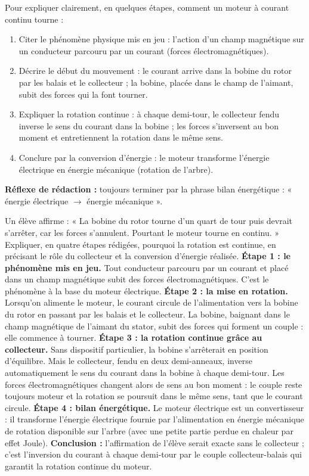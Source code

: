 \documentclass[11pt]{article}
\newcommand{\cle}[1]{{\popxbold\color{popdark}#1}}
\begin{document}
\begin{methode}
Pour expliquer clairement, en quelques étapes, comment un moteur à courant continu tourne :
\begin{enumerate}
\item Citer le \cle{phénomène physique} mis en jeu : l'action d'un champ magnétique sur un conducteur parcouru par un courant (forces électromagnétiques).
\item Décrire le début du mouvement : le courant arrive dans la bobine du rotor par les balais et le collecteur ; la bobine, placée dans le champ de l'aimant, subit des forces qui la font tourner.
\item Expliquer la \cle{rotation continue} : à chaque demi-tour, le collecteur fendu inverse le sens du courant dans la bobine ; les forces s'inversent au bon moment et entretiennent la rotation dans le même sens.
\item Conclure par la \cle{conversion d'énergie} : le moteur transforme l'énergie électrique en énergie mécanique (rotation de l'arbre).
\end{enumerate}
\textbf{Réflexe de rédaction :} toujours terminer par la phrase bilan énergétique : « énergie électrique $\rightarrow$ énergie mécanique ».
\end{methode}

\begin{exoresolu}
Un élève affirme : « La bobine du rotor tourne d'un quart de tour puis devrait s'arrêter, car les forces s'annulent. Pourtant le moteur tourne en continu. » Expliquer, en quatre étapes rédigées, pourquoi la rotation est continue, en précisant le rôle du collecteur et la conversion d'énergie réalisée.
\tcblower
\textbf{Étape 1 : le phénomène mis en jeu.} Tout conducteur parcouru par un courant et placé dans un champ magnétique subit des \cle{forces électromagnétiques}. C'est le phénomène à la base du moteur électrique.
\textbf{Étape 2 : la mise en rotation.} Lorsqu'on alimente le moteur, le courant circule de l'alimentation vers la bobine du rotor en passant par les balais et le collecteur. La bobine, baignant dans le champ magnétique de l'aimant du stator, subit des forces qui forment un couple : elle commence à tourner.
\textbf{Étape 3 : la rotation continue grâce au collecteur.} Sans dispositif particulier, la bobine s'arrêterait en position d'équilibre. Mais le \cle{collecteur}, fendu en deux demi-anneaux, inverse automatiquement le sens du courant dans la bobine à chaque demi-tour. Les forces électromagnétiques changent alors de sens au bon moment : le couple reste toujours moteur et la rotation se poursuit dans le même sens, tant que le courant circule.
\textbf{Étape 4 : bilan énergétique.} Le moteur électrique est un convertisseur : il transforme l'\cle{énergie électrique} fournie par l'alimentation en \cle{énergie mécanique} de rotation disponible sur l'arbre (avec une petite partie perdue en chaleur par effet Joule).
\textbf{Conclusion :} l'affirmation de l'élève serait exacte sans le collecteur ; c'est l'inversion du courant à chaque demi-tour par le couple collecteur-balais qui garantit la rotation continue du moteur.
\end{exoresolu}
\end{document}
